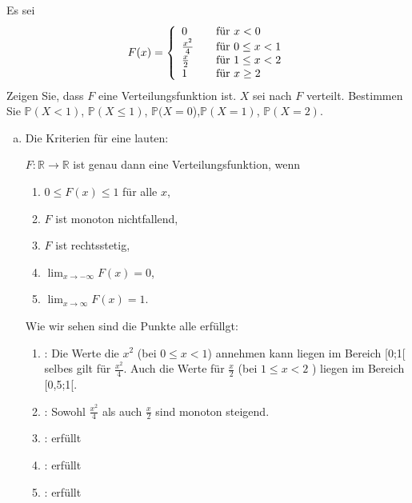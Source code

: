 \begin{uebsp}
\begin{Exercise}[label=ex:2.2]
Es sei \\ 
\[ F(x) = \left\{
  \begin{array}{l l}
    0 & \quad \text{für $x < 0$}\\
    \frac{{x}^{2}}{4}  & \quad \text{für $0 \le x < 1$} \\
    \frac{x}{2} & \quad \text{für $1 \le x < 2$} \\
    1 & \quad \text{für $x \ge 2$}
  \end{array} \right.\]
\Question
Zeigen Sie, dass $F$ eine Verteilungsfunktion ist.
\Question
$X$ sei nach $F$ verteilt. Bestimmen Sie $\mathbb{P}(X < 1)$, $\mathbb{P}(X \le 1)$, $\mathbb{P}(X = 0$),$\mathbb{P}(X = 1)$, $\mathbb{P}(X = 2)$.
\end{Exercise}
\begin{Answer}
\begin{enumerate}[(a)]
    \item{
        Die Kriterien für eine  lauten:
    	\begin{uebsp_theory}
    	$F:\mathbb R\to\mathbb R$ ist genau dann eine Verteilungsfunktion, wenn
    	\begin{enumerate}
    	\item $0\le F(x)\le 1$ für alle $x$,
    	\item $F$ ist monoton nichtfallend,
    	\item $F$ ist rechtsstetig,
    	\item $\lim_{x\to-\infty}F(x)=0$,
    	\item $\lim_{x\to\infty}F(x)=1$.
    	\end{enumerate}
    	\end{uebsp_theory}
    	
    	Wie wir sehen sind die Punkte alle erfüllgt:
    	
    	\begin{enumerate}
    	\item  \checkmark : Die Werte die $x^{2}$ (bei $0 \le x < 1$) annehmen kann liegen im Bereich [0;1[ selbes gilt für $\frac{x^{2}}{4}$. Auch die Werte für $\frac{x}{2}$ (bei $1 \le x < 2$ ) liegen im Bereich [0,5;1[.
    	\item  \checkmark : Sowohl  $\frac{x^{2}}{4}$ als auch $\frac{x}{2}$ sind monoton steigend.
    	\item \checkmark : erfüllt
    	\item \checkmark : erfüllt
    	\item \checkmark : erfüllt
    	\end{enumerate}
    	
}
\end{enumerate}
\end{Answer}
\end{uebsp}
